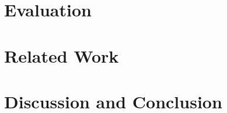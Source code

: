 \documentclass[a4paper,USenglish,anonymous,autoref]{lipics-v2021}
\begin{document}


\section{Evaluation}\label{sec:evaluation}



\section{Related Work}\label{sec:related}



\section{Discussion and Conclusion}\label{sec:discussion}






\appendix

\end{document}
